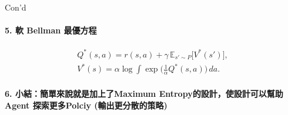 \documentclass{beamer}
\begin{document}
    \begin{frame}[fragile]{Con'd}
        \paragraph{5. 軟 Bellman 最優方程}
            \begin{align}
            \boxed{
              Q^{*}(s,a)=
              r(s,a)+
              \gamma\,\mathbb{E}_{s'\sim P}\bigl[V^{*}(s')\bigr]
            },
            \label{eq:softQ} \\[6pt]
            \boxed{
              V^{*}(s)=
              \alpha\log\!\int
                \exp\!\bigl(\tfrac{1}{\alpha}Q^{*}(s,a)\bigr)\,da
            }.
            \label{eq:softV}
            \end{align}

        \paragraph{6. 小結：簡單來說就是加上了Maximum Entropy的設計，使設計可以幫助Agent 探索更多Polciy (輸出更分散的策略)}
    \end{frame}

    
\end{document}
